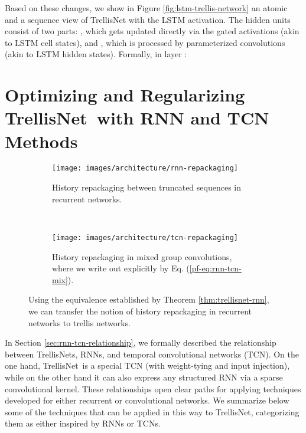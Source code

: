 \documentclass{article} \usepackage{iclr2019_conference,times}
\newcommand{\model}{TrellisNet}
\begin{document}
Based on these changes, we show in Figure \ref{fig:lstm-trellis-network} an atomic and a sequence view of TrellisNet with the LSTM activation. The hidden units  consist of two parts: , which gets updated directly via the gated activations (akin to LSTM cell states), and , which is processed by parameterized convolutions (akin to LSTM hidden states). Formally, in layer :

\vspace{-.1in}

\newpage

\section{Optimizing and Regularizing \model~with RNN and TCN Methods}
\label{appendix:optimize-trellis}

\begin{figure}[h]
    \centering
    \vspace{-.3in}
    \begin{subfigure}[b]{.44\textwidth}
        \centering
        \texttt{[image: images/architecture/rnn-repackaging]}
        \caption{History repackaging between truncated sequences in recurrent networks.}
        \label{fig:rnn-repackaging}
    \end{subfigure}
    ~
    \begin{subfigure}[b]{.54\textwidth}
        \centering
        \texttt{[image: images/architecture/tcn-repackaging]}
        \caption{History repackaging in mixed group convolutions, where we write out  explicitly by Eq. (\ref{pf-eq:rnn-tcn-mix}).}
        \label{fig:tcn-repackaging}
    \end{subfigure}
    \vspace{-.15in}
    \caption{Using the equivalence established by Theorem \ref{thm:trellisnet-rnn}, we can transfer the notion of history repackaging in recurrent networks to trellis networks.}
    \label{fig:repackaging}
\end{figure}

In Section \ref{sec:rnn-tcn-relationship}, we formally described the relationship between TrellisNets, RNNs, and temporal convolutional networks (TCN). On the one hand, \model~is a special TCN (with weight-tying and input injection), while on the other hand it can also express any structured RNN via a sparse convolutional kernel. These relationships open clear paths for applying techniques developed for either recurrent or convolutional networks. We summarize below some of the techniques that can be applied in this way to TrellisNet, categorizing them as either inspired by RNNs or TCNs.
\end{document}
